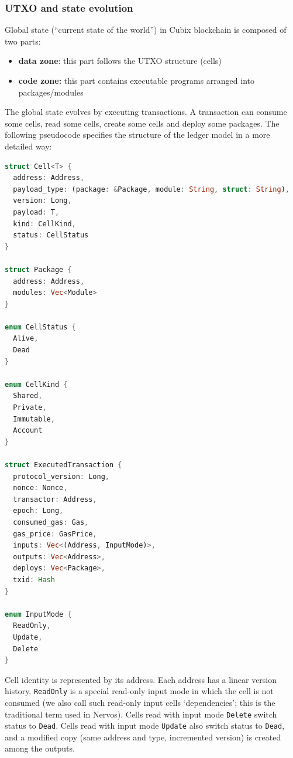 \documentclass[a4paper]{article}
\newcommand{\code}[1]{{\small \texttt{#1}}}
\begin{document}
\subsubsection{UTXO and state evolution}

Global state (``current state of the world'') in Cubix blockchain is composed of two parts:

\begin{itemize}
  \item \textbf{data zone}: this part follows the UTXO structure (cells)
  \item \textbf{code zone:} this part contains executable programs arranged into packages/modules
\end{itemize}

The global state evolves by executing transactions. A transaction can consume some cells, read some cells, create some cells and deploy some packages. The following pseudocode specifies the structure of the ledger model in a more detailed way:

\begin{lstlisting}[language=Rust]
struct Cell<T> {
  address: Address,
  payload_type: (package: &Package, module: String, struct: String),
  version: Long,
  payload: T,
  kind: CellKind,
  status: CellStatus
}

struct Package {
  address: Address,
  modules: Vec<Module>
}

enum CellStatus {
  Alive,
  Dead
}

enum CellKind {
  Shared,
  Private,
  Immutable,
  Account
}

struct ExecutedTransaction {
  protocol_version: Long,
  nonce: Nonce,
  transactor: Address,
  epoch: Long,
  consumed_gas: Gas,
  gas_price: GasPrice,
  inputs: Vec<(Address, InputMode)>,
  outputs: Vec<Address>,
  deploys: Vec<Package>,
  txid: Hash
}

enum InputMode {
  ReadOnly,
  Update,
  Delete
}
\end{lstlisting}

Cell identity is represented by its address. Each address has a linear version history. \code{ReadOnly} is a special read-only input mode in which the cell is not consumed (we also call such read-only input cells `dependencies'; this is the traditional term used in Nervos). Cells read with input mode \code{Delete} switch status to \code{Dead}. Cells read with input mode \code{Update} also switch status to \code{Dead}, and a modified copy (same address and type, incremented version) is created among the outputs.
\end{document}
